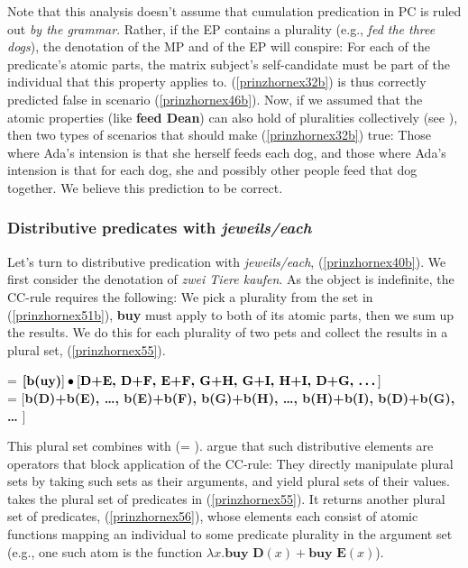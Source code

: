 \documentclass[output=paper,colorlinks,citecolor=brown,
]{langscibook}
\begin{document}
Note that this analysis doesn't assume that cumulation predication in PC is ruled out \textit{by the grammar}. Rather, if the EP contains a plurality (e.g., \textit{fed the three dogs}), the denotation of the MP and of the EP will conspire: For each of the predicate's atomic parts,  the matrix subject's self-candidate must be part of the individual that this property applies to. (\ref{prinzhornex32b}) is thus correctly predicted false in scenario (\ref{prinzhornex46b}). Now, if we assumed that the atomic properties (like \textbf{feed Dean}) can also hold of pluralities collectively (see ), then  two types of scenarios that should make (\ref{prinzhornex32b}) true: Those where Ada's intension is that she herself feeds each dog, and those where Ada's intension is that for each dog, she and possibly other people feed that dog together. We believe this prediction to be correct.

\subsubsection{Distributive predicates with \textit{jeweils/each}}\label{prinzhornsec:dist}  Let's turn to distributive predication with \textit{jeweils/each}, (\ref{prinzhornex40b}). We first consider the denotation of \textit{zwei Tiere kaufen}. As the object is indefinite, the CC-rule requires the following: We pick a plurality from the set in (\ref{prinzhornex51b}),  \textbf{buy} must apply to both of its atomic parts, then we sum up the results. We do this for each plurality of two pets and collect the results in a plural set, (\ref{prinzhornex55}).

\ea {} = $\textbf[\textbf{b(uy)}] \bullet [ \textbf{D+E, D+F, E+F, G+H, G+I, H+I, D+G,  \dots} ]$\\ = 
$[$\textbf{b(D)+b(E), \dots, b(E)+b(F), b(G)+b(H), \dots, b(H)+b(I), b(D)+b(G), \dots} $]$\label{prinzhornex55} \z

This plural set combines with  (= ). \citet{Haslinger:2018b} argue that such distributive elements are operators that block application of the CC-rule: They directly manipulate plural sets by  taking such sets as their arguments, and  yield plural sets of their values.  takes the plural set of predicates in (\ref{prinzhornex55}). It returns another plural set of predicates, (\ref{prinzhornex56}), whose elements each consist of atomic functions  mapping an individual to some predicate plurality in the argument set (e.g., one such atom is the function $\lambda x.\textbf{buy D}(x)+\textbf{buy E}(x)$).
\end{document}
